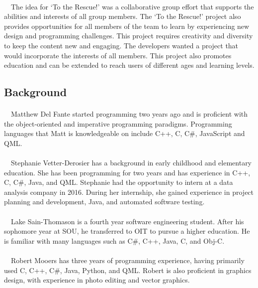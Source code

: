 \documentclass[12pt]{report}
\begin{document}
			\paragraph{}\ \ The idea for ‘To the Rescue!’ was a collaborative group effort that supports the abilities and interests of all group members. The ‘To the Rescue!’ project also provides opportunities for all members of the team to learn by experiencing new design and programming challenges. This project requires creativity and diversity to keep the content new and engaging. The developers wanted a project that would incorporate the interests of all members. This project also promotes education and can be extended to reach users of different ages and learning levels. 
		\subsection{Background}
			\paragraph{}\ \ Matthew Del Fante started programming two years ago and is proficient with the object-oriented and imperative programming paradigms. Programming languages that Matt is knowledgeable on include C++, C, C\#, JavaScript and QML.
			
			\paragraph{}\ \ Stephanie Vetter-Derosier has a background in early childhood and elementary education. She has been programming for two years and has experience in C++, C, C\#, Java, and QML. Stephanie had the opportunity to intern at a data analysis company in 2016. During her internship, she gained experience in project planning and development, Java, and automated software testing.
			
			\paragraph{}\ \ Lake Sain-Thomason is a fourth year software engineering student. After his sophomore year at SOU, he transferred to OIT to pursue a higher education. He is familiar with many languages such as C\#, C++, Java, C, and Obj-C. 
			
			\paragraph{}\ \ Robert Mooers has three years of programming experience, having primarily used C, C++, C\#, Java, Python, and QML. Robert is also proficient in graphics design, with experience in photo editing and vector graphics.
			
\end{document}
